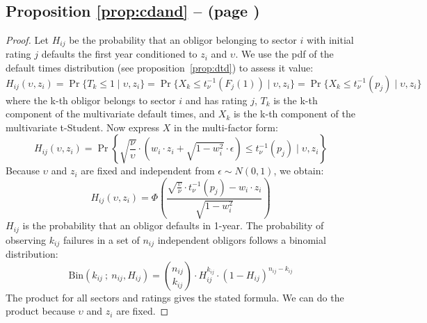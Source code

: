 \documentclass[11pt,fleqn]{book} %
\begin{document}
\section{}

\subsection{Proposition \ref{prop:cdand} --  (page \pageref{prop:cdand})}
\begin{proof}
	Let $H_{ij}$ be the probability that an obligor belonging to sector $i$
	with initial rating $j$ defaults the first year conditioned to $z_i$ 
	and $\upsilon$. We use the pdf of the default times distribution (see 
	proposition~\ref{prop:dtd}) to assess it value:
	\begin{displaymath}
		H_{ij}(\upsilon,z_i) = 
		\Pr\{T_k \le 1 \mid \upsilon, z_i\} = 
		\Pr\{ X_k \le t_{\nu}^{-1}(F_j(1)) \mid \upsilon, z_i\} = 
		\Pr\{ X_k \le t_{\nu}^{-1}(p_j) \mid \upsilon, z_i\}
	\end{displaymath}
	where the k-th obligor belongs to sector $i$ and has rating $j$, 
	$T_k$ is the k-th component of the multivariate default 
	times, and $X_k$ is the k-th component of the multivariate t-Student. 
	Now express $X$ in the multi-factor form:
	\begin{displaymath}
		H_{ij}(\upsilon,z_i) = \Pr \left\{ 
		\sqrt{\frac{\nu}{\upsilon}} \cdot \left( w_i \cdot z_i + \sqrt{1-w_i^2} \cdot \epsilon\right)
		\le t_{\nu}^{-1}(p_j) \mid \upsilon, z_i
		\right\}
	\end{displaymath}
	Because $\upsilon$ and $z_i$ are fixed and independent from $\epsilon \sim N(0,1)$, we obtain:
	\begin{displaymath}
		H_{ij}(\upsilon,z_i) = \Phi\left(  
		\frac{\sqrt{\frac{\upsilon}{\nu}} \cdot t_{\nu}^{-1}(p_j) - w_i\cdot z_i}{\sqrt{1-w_i^2}}
		\right)
	\end{displaymath}
	$H_{ij}$ is the probability that an obligor defaults in 1-year. The 
	probability of observing $k_{ij}$ failures in a set of $n_{ij}$ independent
	obligors follows a binomial distribution:
	\begin{displaymath}
		\text{Bin}(k_{ij}\ ;\ n_{ij},H_{ij}) = 
		\binom{n_{ij}}{k_{ij}} \cdot H_{ij}^{k_{ij}} \cdot (1-H_{ij})^{n_{ij}-k_{ij}}
	\end{displaymath}
	The product for all sectors and ratings gives the stated formula. 
	We can do the product because $\upsilon$ and $z_i$ are fixed.
\end{proof}






\end{document}
